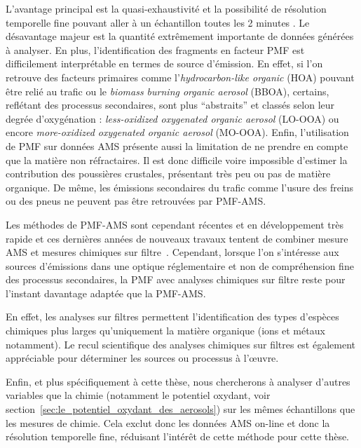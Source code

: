 L'avantage principal est la quasi-exhaustivité et la possibilité de
résolution temporelle fine pouvant aller à un échantillon toutes les 2 minutes
\autocite{marmureanuOnline2020}.  Le désavantage majeur est la quantité extrêmement
importante de données générées à analyser. En plus, l'identification des fragments en
facteur PMF est difficilement interprétable en termes de source d'émission. En effet, si
l'on retrouve des facteurs primaires comme l'\textit{hydrocarbon-like organic} (HOA)
pouvant être relié au trafic ou le \textit{biomass burning organic aerosol} (BBOA),
certains, reflétant des processus secondaires, sont plus ``abstraits'' et classés selon leur
degrée d'oxygénation : \textit{less-oxidized oxygenated organic aerosol} (LO-OOA) ou
encore \textit{more-oxidized oxygenated organic aerosol} (MO-OOA).
Enfin, l'utilisation de PMF sur données AMS présente aussi la limitation de ne prendre en
compte que la matière non réfractaires. Il est donc difficile voire impossible d'estimer la
contribution des poussières crustales, présentant très peu ou pas de matière organique. De
même, les émissions secondaires du trafic comme l'usure des freins ou des pneus ne peuvent
pas être retrouvées par PMF-AMS.

Les méthodes de PMF-AMS sont cependant récentes et en développement très rapide et ces
dernières années de nouveaux travaux tentent de combiner mesure AMS et mesures chimiques sur
filtre~\autocite{vlachouAdvanced2018,vlachouDevelopment2019}.  Cependant, lorsque l'on
s'intéresse aux sources d'émissions dans une optique réglementaire et non de compréhension
fine des processus secondaires, la PMF avec analyses chimiques sur filtre reste pour
l'instant davantage adaptée que la PMF-AMS.

En effet, les analyses sur filtres permettent l'identification des types d'espèces
chimiques plus larges qu'uniquement la matière organique (ions et métaux notamment).  Le
recul scientifique des analyses chimiques sur filtres est également appréciable pour
déterminer les sources ou processus à l'œuvre.

Enfin, et plus spécifiquement à cette thèse, nous chercherons à analyser d'autres
variables que la chimie (notamment le potentiel oxydant, voir
section~\ref{sec:le_potentiel_oxydant_des_aerosols}) sur les mêmes échantillons que les
mesures de chimie. Cela exclut donc les données AMS on-line et donc la résolution
temporelle fine, réduisant l'intérêt de cette méthode pour cette thèse.

